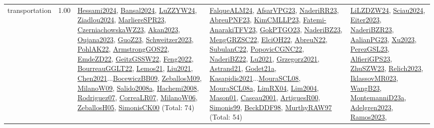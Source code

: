 {\begin{longtable}{p{3cm}r>{\raggedright\arraybackslash}p{6cm}>{\raggedright\arraybackslash}p{6cm}>{\raggedright\arraybackslash}p{8cm}}
\index{transportation}\index{Concepts!transportation}transportation &  1.00 & \hyperref[detail:Hessami2024]{Hessami2024}, \hyperref[detail:Bansal2024]{Bansal2024}, \hyperref[detail:LuZZYW24]{LuZZYW24}, \hyperref[detail:Ziadlou2024]{Ziadlou2024}, \hyperref[detail:MarliereSPR23]{MarliereSPR23}, \hyperref[detail:CzerniachowskaWZ23]{CzerniachowskaWZ23}, \hyperref[detail:Akan2023]{Akan2023}, \hyperref[detail:Oujana2023]{Oujana2023}, \hyperref[detail:GuoZ23]{GuoZ23}, \hyperref[detail:Schweitzer2023]{Schweitzer2023}, \hyperref[detail:PohlAK22]{PohlAK22}, \hyperref[detail:ArmstrongGOS22]{ArmstrongGOS22}, \hyperref[detail:EmdeZD22]{EmdeZD22}, \hyperref[detail:GeitzGSSW22]{GeitzGSSW22}, \hyperref[detail:Feng2022]{Feng2022}, \hyperref[detail:BourreauGGLT22]{BourreauGGLT22}, \hyperref[detail:Lemos21]{Lemos21}, \hyperref[detail:Liu2021]{Liu2021}, \hyperref[detail:Chen2021]{Chen2021}...\hyperref[detail:BocewiczBB09]{BocewiczBB09}, \hyperref[detail:ZeballosM09]{ZeballosM09}, \hyperref[detail:MilanoW09]{MilanoW09}, \hyperref[detail:Salido2008a]{Salido2008a}, \hyperref[detail:Hachemi2008]{Hachemi2008}, \hyperref[detail:Rodriguez07]{Rodriguez07}, \hyperref[detail:CorreaLR07]{CorreaLR07}, \hyperref[detail:MilanoW06]{MilanoW06}, \hyperref[detail:ZeballosH05]{ZeballosH05}, \hyperref[detail:SimonisCK00]{SimonisCK00} (Total: 74) & \hyperref[detail:FalqueALM24]{FalqueALM24}, \hyperref[detail:AfsarVPG23]{AfsarVPG23}, \hyperref[detail:NaderiRR23]{NaderiRR23}, \hyperref[detail:AbreuPNF23]{AbreuPNF23}, \hyperref[detail:KimCMLLP23]{KimCMLLP23}, \hyperref[detail:Fatemi-AnarakiTFV23]{Fatemi-AnarakiTFV23}, \hyperref[detail:GokPTGO23]{GokPTGO23}, \hyperref[detail:NaderiBZ23]{NaderiBZ23}, \hyperref[detail:MengGRZSC22]{MengGRZSC22}, \hyperref[detail:ElciOH22]{ElciOH22}, \hyperref[detail:AbreuN22]{AbreuN22}, \hyperref[detail:SubulanC22]{SubulanC22}, \hyperref[detail:PopovicCGNC22]{PopovicCGNC22}, \hyperref[detail:NaderiBZ22]{NaderiBZ22}, \hyperref[detail:Lu2021]{Lu2021}, \hyperref[detail:Grzegorz2021]{Grzegorz2021}, \hyperref[detail:Astrand21]{Astrand21}, \hyperref[detail:Godet21a]{Godet21a}, \hyperref[detail:Kasapidis2021]{Kasapidis2021}...\hyperref[detail:MouraSCL08]{MouraSCL08}, \hyperref[detail:MouraSCL08a]{MouraSCL08a}, \hyperref[detail:LimRX04]{LimRX04}, \hyperref[detail:Lim2004]{Lim2004}, \hyperref[detail:Mason01]{Mason01}, \hyperref[detail:Caseau2001]{Caseau2001}, \hyperref[detail:ArtiguesR00]{ArtiguesR00}, \hyperref[detail:Simonis99]{Simonis99}, \hyperref[detail:BeckDDF98]{BeckDDF98}, \hyperref[detail:MurthyRAW97]{MurthyRAW97} (Total: 54) & \hyperref[detail:LiLZDZW24]{LiLZDZW24}, \hyperref[detail:Sciau2024]{Sciau2024}, \hyperref[detail:Eiter2023]{Eiter2023}, \hyperref[detail:NaderiBZR23]{NaderiBZR23}, \hyperref[detail:AalianPG23]{AalianPG23}, \hyperref[detail:Xu2023]{Xu2023}, \hyperref[detail:PerezGSL23]{PerezGSL23}, \hyperref[detail:AlfieriGPS23]{AlfieriGPS23}, \hyperref[detail:ZhuSZW23]{ZhuSZW23}, \hyperref[detail:Relich2023]{Relich2023}, \hyperref[detail:IklassovMR023]{IklassovMR023}, \hyperref[detail:WangB23]{WangB23}, \hyperref[detail:MontemanniD23a]{MontemanniD23a}, \hyperref[detail:Adelgren2023]{Adelgren2023}, \hyperref[detail:Ramos2023]{Ramos2023}, 
\end{longtable}}
